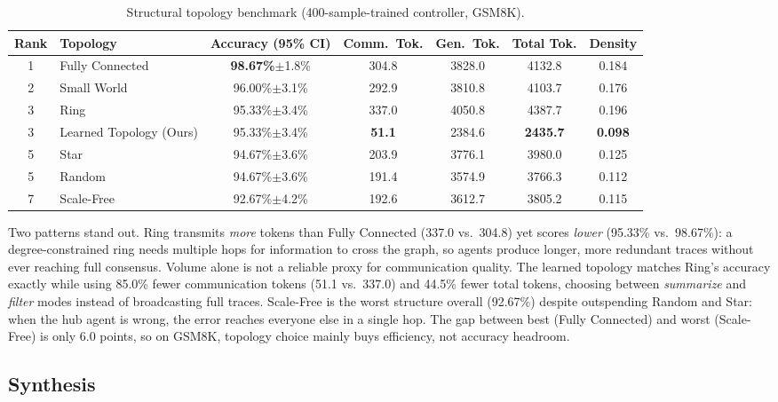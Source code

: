 \documentclass[11pt]{article}
\begin{document}
\begin{table}[t]
\centering
\small
\begin{tabular}{clccccc}
\toprule
Rank & Topology & Accuracy (95\% CI) & Comm.\ Tok. & Gen.\ Tok. & Total Tok. & Density \\
\midrule
1 & Fully Connected      & \textbf{98.67\%}$\pm$1.8\% & 304.8         & 3828.0 & 4132.8 & 0.184 \\
2 & Small World          & 96.00\%$\pm$3.1\%          & 292.9         & 3810.8 & 4103.7 & 0.176 \\
3 & Ring                 & 95.33\%$\pm$3.4\%          & 337.0         & 4050.8 & 4387.7 & 0.196 \\
3 & Learned Topology (Ours) & 95.33\%$\pm$3.4\%       & \textbf{51.1} & 2384.6 & \textbf{2435.7} & \textbf{0.098} \\
5 & Star                 & 94.67\%$\pm$3.6\%          & 203.9         & 3776.1 & 3980.0 & 0.125 \\
5 & Random               & 94.67\%$\pm$3.6\%          & 191.4         & 3574.9 & 3766.3 & 0.112 \\
7 & Scale-Free           & 92.67\%$\pm$4.2\%          & 192.6         & 3612.7 & 3805.2 & 0.115 \\
\bottomrule
\end{tabular}
\caption{Structural topology benchmark (400-sample-trained controller,
GSM8K).}
\label{tab:topo-benchmark}
\end{table}

Two patterns stand out. Ring transmits \emph{more} tokens than Fully
Connected (337.0 vs.\ 304.8) yet scores \emph{lower} (95.33\% vs.\
98.67\%): a degree-constrained ring needs multiple hops for information to
cross the graph, so agents produce longer, more redundant traces without
ever reaching full consensus. Volume alone is not a reliable proxy for
communication quality. The learned topology matches Ring's accuracy exactly
while using 85.0\% fewer communication tokens (51.1 vs.\ 337.0) and 44.5\%
fewer total tokens, choosing between \textit{summarize} and \textit{filter}
modes instead of broadcasting full traces. Scale-Free is the worst
structure overall (92.67\%) despite outspending Random and Star: when the
hub agent is wrong, the error reaches everyone else in a single hop. The
gap between best (Fully Connected) and worst (Scale-Free) is only 6.0
points, so on GSM8K, topology choice mainly buys efficiency, not accuracy
headroom.

\subsection{Synthesis}
\label{sec:synthesis}
\end{document}
